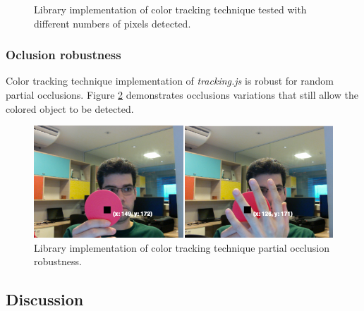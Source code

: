 \begin{figure}[!htb]
   \caption{Library implementation of color tracking technique tested with different numbers of pixels detected.}
   \label{figure:color_fps}
\end{figure}

\newpage


\subsubsection{Oclusion robustness} %
\label{subsub:evaluation:color_tracking_algorithm:results:occlusion_robustness}

Color tracking technique implementation of \textit{tracking.js} is robust for random partial occlusions. Figure \ref{figure:color_occlusion} demonstrates occlusions variations that still allow the colored object to be detected.

\begin{figure}[!htb]
  \centering
  \includegraphics[width=\linewidth]{chapters/evaluation/color_occlusion.png}
  \caption{Library implementation of color tracking technique partial occlusion robustness.}
  \label{figure:color_occlusion}
\end{figure}


\subsection{Discussion} %
\label{sub:evaluation:color_tracking_algorithm:discussion}

